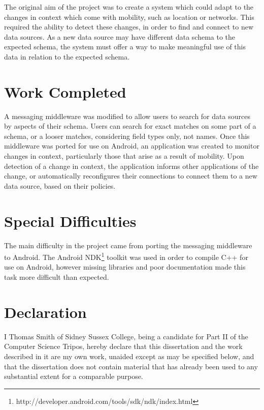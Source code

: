 \documentclass[12pt,twoside,notitlepage]{report}
\begin{document}
The original aim of the project was to create a system which could adapt to the changes in context which come with mobility, such as location or networks. 
This required the ability to detect these changes, in order to find and connect to new data sources. 
As a new data source may have different data schema to the expected schema, the system must offer a way to make meaningful use of this data in relation to the expected schema.

\section*{Work Completed}

A messaging middleware was modified to allow users to search for data sources by aspects of their schema. Users can search for exact matches on some part of a schema, or a looser matches, considering field types only, not names.
Once this middleware was ported for use on Android, an application was created to monitor changes in context, particularly those that arise as a result of mobility. Upon detection of a change in context, the application informs other applications of the change, or automatically reconfigures their connections to connect them to a new data source, based on their policies.

\section*{Special Difficulties}

The main difficulty in the project came from porting the messaging middleware to Android. The Android NDK\footnote{http://developer.android.com/tools/sdk/ndk/index.html} toolkit was used in order to compile C++ for use on Android, however missing libraries and poor documentation made this task more difficult than expected.
 
\newpage
\section*{Declaration}

I Thomas Smith of Sidney Sussex College, being a candidate for Part II of the Computer
Science Tripos, hereby declare that this dissertation and the work described in it are my own work,
unaided except as may be specified below, and that the dissertation
does not contain material that has already been used to any substantial
extent for a comparable purpose.

\bigskip
{}
\end{document}
